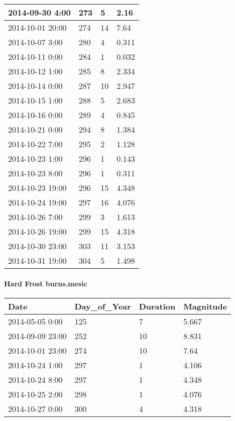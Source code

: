 \documentclass[
]{article}
\begin{document}
\begin{tabular}{l|l|l|l}
\hline
2014-09-30 4:00 & 273 & 5 & 2.16\\
\hline
2014-10-01 20:00 & 274 & 14 & 7.64\\
\hline
2014-10-07 3:00 & 280 & 4 & 0.311\\
\hline
2014-10-11 0:00 & 284 & 1 & 0.032\\
\hline
2014-10-12 1:00 & 285 & 8 & 2.334\\
\hline
2014-10-14 0:00 & 287 & 10 & 2.947\\
\hline
2014-10-15 1:00 & 288 & 5 & 2.683\\
\hline
2014-10-16 0:00 & 289 & 4 & 0.845\\
\hline
2014-10-21 0:00 & 294 & 8 & 1.384\\
\hline
2014-10-22 7:00 & 295 & 2 & 1.128\\
\hline
2014-10-23 1:00 & 296 & 1 & 0.143\\
\hline
2014-10-23 8:00 & 296 & 1 & 0.311\\
\hline
2014-10-23 19:00 & 296 & 15 & 4.348\\
\hline
2014-10-24 19:00 & 297 & 16 & 4.076\\
\hline
2014-10-26 7:00 & 299 & 3 & 1.613\\
\hline
2014-10-26 19:00 & 299 & 15 & 4.318\\
\hline
2014-10-30 23:00 & 303 & 11 & 3.153\\
\hline
2014-10-31 19:00 & 304 & 5 & 1.498\\
\hline
\end{tabular}

\hypertarget{hard-frost-burns.mesic}{%
\paragraph{Hard Frost burns.mesic}\label{hard-frost-burns.mesic}}

\begin{tabular}{l|l|l|l}
\hline
Date & Day\_of\_Year & Duration & Magnitude\\
\hline
2014-05-05 0:00 & 125 & 7 & 5.667\\
\hline
2014-09-09 23:00 & 252 & 10 & 8.831\\
\hline
2014-10-01 23:00 & 274 & 10 & 7.64\\
\hline
2014-10-24 1:00 & 297 & 1 & 4.106\\
\hline
2014-10-24 8:00 & 297 & 1 & 4.348\\
\hline
2014-10-25 2:00 & 298 & 1 & 4.076\\
\hline
2014-10-27 0:00 & 300 & 4 & 4.318\\
\hline
\end{tabular}
\end{document}
